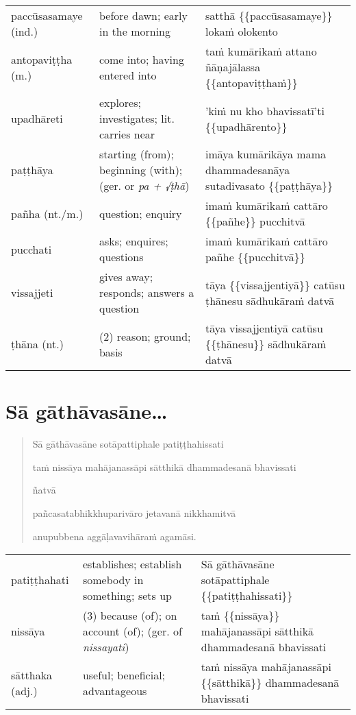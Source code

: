 \documentclass[11pt,oneside]{memoir}
\begin{document}
\begin{longtable}{L{\colOne} L{\colTwo} H}
paccūsasamaye (ind.) & before dawn; early in the morning & satthā \{\{paccūsasamaye\}\} lokaṁ olokento\\[0pt]
antopaviṭṭha (m.) & come into; having entered into & taṁ kumārikaṁ attano ñāṇajālassa \{\{antopaviṭṭhaṁ\}\}\\[0pt]
upadhāreti & explores; investigates; lit. carries near & 'kiṁ nu kho bhavissatī'ti \{\{upadhārento\}\}\\[0pt]
paṭṭhāya & starting (from); beginning (with); (ger. or \emph{pa + √ṭhā}) & imāya kumārikāya mama dhammadesanāya sutadivasato \{\{paṭṭhāya\}\}\\[0pt]
pañha (nt./m.) & question; enquiry & imaṁ kumārikaṁ cattāro \{\{pañhe\}\} pucchitvā\\[0pt]
pucchati & asks; enquires; questions & imaṁ kumārikaṁ cattāro pañhe \{\{pucchitvā\}\}\\[0pt]
vissajjeti & gives away; responds; answers a question & tāya \{\{vissajjentiyā\}\} catūsu ṭhānesu sādhukāraṁ datvā\\[0pt]
ṭhāna (nt.) & (2) reason; ground; basis & tāya vissajjentiyā catūsu \{\{ṭhānesu\}\} sādhukāraṁ datvā\\[0pt]
\end{longtable}

\clearpage

\section{Sā gāthāvasāne\ldots{}}
\label{sec:org0a58875}

\begin{quote}
Sā gāthāvasāne sotāpattiphale patiṭṭhahissati

taṁ nissāya mahājanassāpi sātthikā dhammadesanā bhavissati

ñatvā

pañcasatabhikkhuparivāro jetavanā nikkhamitvā

anupubbena aggāḷavavihāraṁ agamāsi.
\end{quote}

\begin{longtable}{L{\colOne} L{\colTwo} H}
patiṭṭhahati & establishes; establish somebody in something; sets up & Sā gāthāvasāne sotāpattiphale \{\{patiṭṭhahissati\}\}\\[0pt]
nissāya & (3) because (of); on account (of); (ger. of \emph{nissayati}) & taṁ \{\{nissāya\}\} mahājanassāpi sātthikā dhammadesanā bhavissati\\[0pt]
sātthaka (adj.) & useful; beneficial; advantageous & taṁ nissāya mahājanassāpi \{\{sātthikā\}\} dhammadesanā bhavissati\\[0pt]
\end{longtable}
\end{document}
